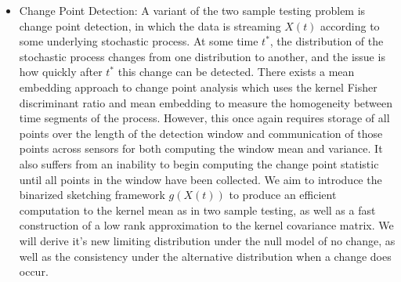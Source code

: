 \begin{itemize}


\item Change Point Detection: A variant of the two sample testing problem is change point detection, in which the data is streaming $X(t)$ according to some underlying stochastic process.  At some time $t^*$, the distribution of the stochastic process changes from one distribution to another, and the issue is how quickly after $t^*$ this change can be detected.   
There exists a mean embedding approach to change point analysis \cite{harchaoui2009kernel} which uses the kernel Fisher discriminant ratio and mean embedding to measure the homogeneity between time segments of the process.  However, this once again requires storage of all points over the length of the detection window and communication of those points across sensors for both computing the window mean and variance. It also suffers from an inability to begin computing the change point statistic until all points in the window have been collected.  We aim to introduce the binarized sketching framework $g(X(t))$ to produce an efficient computation to the kernel mean as in two sample testing, as well as a fast construction of a low rank approximation to the kernel covariance matrix.  We will derive it's new limiting distribution under the null model of no change, as well as the consistency under the alternative distribution when a change does occur.  


\end{itemize}
